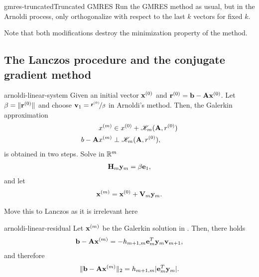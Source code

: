 \begin{Algorithm*}{gmres-truncated}{Truncated GMRES}
  Run the GMRES method as usual, but in the Arnoldi process, only
  orthogonalize with respect to the last $k$ vectors for fixed $k$.
\end{Algorithm*}

\begin{remark}
  Note that both modifications destroy the minimization property of the method.
\end{remark}

\subsection{The Lanczos procedure and the conjugate gradient method}

\begin{Theorem}{arnoldi-linear-system}
  Given an initial vector $\mathbf x^{(0)}$ and
  $\mathbf r^{(0)} = \mathbf b - \mathbf A \mathbf x^{(0)}$. Let $\beta=\lVert\mathbf r^{(0)}\rVert$
  and choose $\mathbf v_1 =\nicefrac{\mathbf r^{(0)}}{\beta}$ in Arnoldi's
  method. Then, the Galerkin approximation
  \begin{align}
    x^{(m)} &\in x^{(0)} + \mathscr K_m(\mathbf A,r^{(0)})\\
    b-\mathbf A x^{(m)} &\perp \mathscr K_m(\mathbf A,r^{(0)}),
  \end{align}
  is obtained in two steps. Solve in $\mathbb R^m$
  \begin{gather}
    \mathbf H_m\mathbf y_m = \beta\mathbf e_1,
  \end{gather}
  and let
  \begin{gather}
    \mathbf x^{(m)} = \mathbf x^{(0)} + \mathbf V_m \mathbf y_m.
  \end{gather}
\end{Theorem}

\begin{todo}
  Move this to Lanczos as it is irrelevant here
\end{todo}

\begin{Theorem}{arnoldi-linear-residual}
  Let $\mathbf x^{(m)}$ be the Galerkin solution in
  . Then, there holds
  \begin{gather}
    \mathbf b-\mathbf A\mathbf x^{(m)} = -h_{m+1,m} \mathbf e_m^T \mathbf y_m \mathbf v_{m+1},
  \end{gather}
  and therefore
  \begin{gather}
    \lVert\mathbf b-\mathbf A\mathbf x^{(m)}\rVert_2 = h_{m+1,m} \lvert\mathbf e_m^T \mathbf y_m\rvert.
  \end{gather}  
\end{Theorem}

